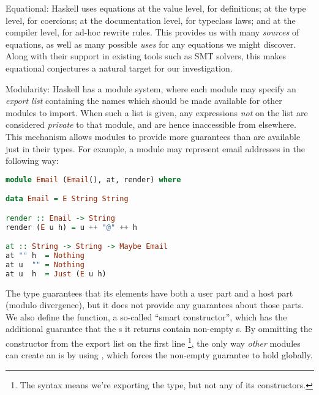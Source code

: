 \documentclass[]{article}
\begin{document}
\begin{description}
\item{Equational}: Haskell uses equations at the value level, for definitions; at the type level, for coercions; at the documentation level, for typeclass laws; and at the compiler level, for ad-hoc rewrite rules. This provides us with many \emph{sources} of equations, as well as many possible \emph{uses} for any equations we might discover. Along with their support in existing tools such as SMT solvers, this makes equational conjectures a natural target for our investigation.

\item{Modularity}: Haskell has a module system, where each module may specify an \emph{export list} containing the names which should be made available for other modules to import. When such a list is given, any expressions \emph{not} on the list are considered \emph{private} to that module, and are hence inaccessible from elsewhere. This mechanism allows modules to provide more guarantees than are available just in their types. For example, a module may represent email addresses in the following way:

\begin{lstlisting}[language=Haskell, xleftmargin=.2\textwidth, xrightmargin=.2\textwidth, upquote=true]
module Email (Email(), at, render) where

data Email = E String String

render :: Email -> String
render (E u h) = u ++ "@" ++ h

at :: String -> String -> Maybe Email
at "" h  = Nothing
at u  "" = Nothing
at u  h  = Just (E u h)
\end{lstlisting}

The  type guarantees that its elements have both a user part and a host part (modulo divergence), but it does not provide any guarantees about those parts. We also define the  function, a so-called ``smart constructor'', which has the additional guarantee that the s it returns contain non-empty s. By ommitting the  constructor from the export list on the first line \footnote{The syntax  means we're exporting the  type, but not any of its constructors.}, the only way \emph{other} modules can create an  is by using , which forces the non-empty guarantee to hold globally.

\end{description}
\end{document}
